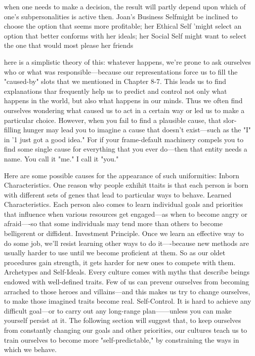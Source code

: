 \documentclass[10pt,a4paper]{article}
\begin{document}
when one needs to make a decision, the result will partly depend upon which of one's subpersonalities is active then. Joan's Business Selfmight be inclined to choose the option that seems more profitable; her Ethical Self 'might select an option that better conforms with her ideals; her Social Self might want to select the one that would most please her friends \cite[p.~306]{minsky}

here is a simplistic theory of this: whatever happens, we're prone to ask ourselves who or what was responsible—because our representations force us to fill the "caused-by" slots that we mentioned in Chapter 8-7. This leads us to find explanations thar frequently help us to predict and control not only what happens in the world, but also what happens in our minds. Thus we often find ourselves wondering what caused us to act in a certain way or led us to make a particular choice. However, when you fail to find a plausible cause, that slor-filling hunger may lead you to imagine a cause that doesn't exist—such as the "I" in '1 just got a good idea." For if your frame-default machinery compels you to find some single cause for everything that you ever do—then that entity needs a name. You call it "me." I call it "you." \cite[p.~309]{minsky}

Here are some possible causes for the appearance of such uniformities:
Inborn Characteristics. One reason why people exhihit ttaits is that each person is born with different sets of genes that lead to particular ways to behave.
Learned Characteristics. Each person also comes to learn individual goals and priorities that influence when various resources get engaged—as when to become angry or afraid—-so that some individuals may tend more than others to become belligerent or diffident.
Investment Principle. Once we learn an effective way to do some job, we'll resist learning other ways to do it—-because new methods are usually harder to use until we become proficient at them. So as our oldet procedures gain strength, it gets harder for new ones to compete with them.
Archetypes and Self-Ideals. Every culture comes with myths that describe beings endowed with well-defined traits. Few of us can prevenr ourselves from becoming arrached to those heroes and villains—and this makes us try to change ourselves, to make those imagined traits become real.
Self-Control. It is hard to achieve any difficult goal—or to carry out any long-range plan——unless you can make yourself persist at it. The following section will suggest that, to keep ourselves from constantly changing our goals and other priorities, our cultures teach us to train ourselves to become more "self-predictable," by constraining the ways in which we behave. \cite[p.~310]{minsky}
\end{document}
